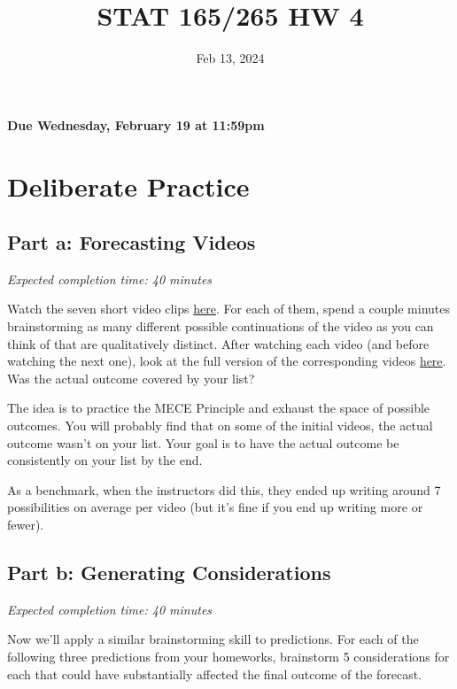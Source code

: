 \documentclass[11pt]{article}
\title{STAT 165/265 HW 4}
\date{Feb 13, 2024}
\begin{document}
\maketitle

\hfill \textbf{Due Wednesday, February 19 at 11:59pm}

\section*{Deliberate Practice}

\subsection*{Part a: Forecasting Videos}

\emph{Expected completion time: 40 minutes}

Watch the seven short video clips \href{http://www.forecastingclass.com/assets/initial_clips.zip}{here}. For each of them, spend a couple minutes brainstorming as many different 
possible continuations of the video as you can think of that are qualitatively distinct. After watching each video (and before watching the next one), look at the 
full version of the corresponding videos \href{http://www.forecastingclass.com/assets/full_videos.zip}{here}. Was the actual outcome covered by your list?

The idea is to practice the MECE Principle and exhaust the space of possible outcomes. You will probably find that on some of the initial videos, the actual outcome wasn't on your list. 
Your goal is to have the actual outcome be consistently on your list by the end.

As a benchmark, when the instructors did this, they ended up writing around 7 possibilities on average per video (but it's fine if you end up writing more or fewer).


\subsection*{Part b: Generating Considerations}

\emph{Expected completion time: 40 minutes}

Now we'll apply a similar brainstorming skill to predictions. 
For each of the following three predictions from your homeworks, brainstorm 5 considerations for each that could have substantially affected the final outcome of the forecast.
\end{document}

